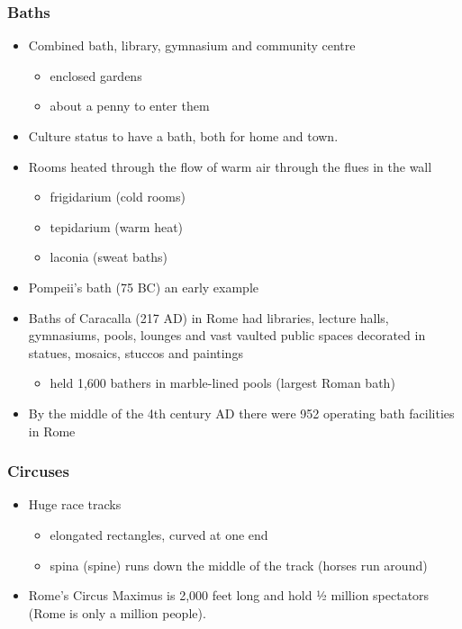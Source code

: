 \documentclass[12pt, twoside]{article}
\begin{document}
\subsubsection{Baths}
\begin{itemize}
\item Combined bath, library, gymnasium and community centre
	\begin{itemize}
	\item enclosed gardens
	\item about a penny to enter them
	\end{itemize}
\item Culture status to have a bath, both for home and town.
\item Rooms heated through the flow of warm air through the flues in the wall
	\begin{itemize}
	\item frigidarium (cold rooms)
	\item tepidarium (warm heat)
	\item laconia (sweat baths)
	\end{itemize}
\item Pompeii’s bath (75 BC) an early example
\item Baths of Caracalla (217 AD) in Rome had libraries, lecture halls, gymnasiums, pools, lounges and vast vaulted public spaces decorated in statues, mosaics, stuccos and paintings  
	\begin{itemize} 
	\item held 1,600 bathers in marble-lined pools (largest Roman bath)
	\end{itemize}
\item By the middle of the 4th century AD there were 952 operating bath facilities in Rome
\end{itemize}

\subsubsection{Circuses}
\begin{itemize}
\item Huge race tracks
	\begin{itemize}
	\item elongated rectangles, curved at one end
	\item spina (spine) runs down the middle of the track (horses run around)
	\end{itemize}
\item Rome’s Circus Maximus is 2,000 feet long and hold ½ million spectators (Rome is only a million people).
\end{itemize}
\end{document}
